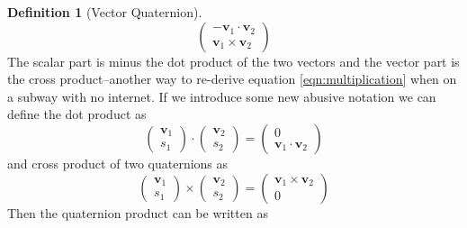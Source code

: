 \documentclass{amsart}
\theoremstyle{definition}
\newtheorem{definition}[theorem]{Definition}
\theoremstyle{remark}
\numberwithin{equation}{section}
\begin{document}
\begin{definition}[Vector Quaternion]
\begin{equation}
\begin{pmatrix}
      -\mathbf{v}_1\cdot \mathbf{v}_2\\
      \mathbf{v}_1 \times \mathbf{v}_2
    \end{pmatrix}
  \end{equation}
  The scalar part is minus the dot product of the two vectors and the vector part is the cross product--another way to re-derive equation \ref{eqn:multiplication} when on a subway with no internet. If we introduce some new abusive notation we can define the dot product as
\begin{equation}
		\begin{pmatrix}
      \mathbf{v}_1 \\
      s_1
    \end{pmatrix}
    \cdot
    \begin{pmatrix}
      \mathbf{v}_2 \\
      s_2
    \end{pmatrix}
    =
    \begin{pmatrix}
      0 \\
      \mathbf{v}_1 \cdot \mathbf{v}_2
    \end{pmatrix}
	\end{equation}
	and cross product of two quaternions as
	\begin{equation}
	\begin{pmatrix}
      \mathbf{v}_1 \\
      s_1
    \end{pmatrix}
    \times
    \begin{pmatrix}
      \mathbf{v}_2 \\
      s_2
    \end{pmatrix}
    =
    \begin{pmatrix}
      \mathbf{v}_1 \times \mathbf{v}_2 \\
      0
    \end{pmatrix}
	\end{equation}
	Then the quaternion product can be written as
\end{definition}
\end{document}
